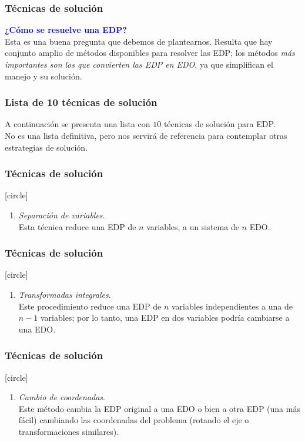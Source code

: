 \documentclass[12pt]{beamer}
\begin{document}
\begin{frame}
\frametitle{Técnicas de solución}
\textcolor{blue}{\textbf{¿Cómo se resuelve una EDP?}}
\\
\bigskip
\pause
Esta es una buena pregunta que debemos de plantearnos. Resulta que hay conjunto amplio de métodos disponibles para resolver las EDP; los métodos \emph{más importantes son los que convierten las EDP en EDO}, ya que simplifican el manejo y su solución.
\end{frame}
\begin{frame}
\frametitle{Lista de 10 técnicas de solución}
A continuación se presenta una lista con $10$ técnicas de solución para EDP.
\\
\bigskip
No es una lista definitiva, pero nos servirá de referencia para contemplar otras estrategias de solución.
\end{frame}
\begin{frame}
\frametitle{Técnicas de solución}
[circle]
\begin{enumerate}
\item \emph{Separación de variables}.
\\
\bigskip
Esta técnica reduce una EDP de $n$ variables, a un sistema de $n$ EDO.
\seti
\end{enumerate}
\end{frame}
\begin{frame}
\frametitle{Técnicas de solución}
[circle]
\begin{enumerate}
\conti
\item \emph{Transformadas integrales}. 
\\
\bigskip
Este procedimiento reduce una EDP de $n$ variables independientes a una de $n - 1$ variables; por lo tanto, una EDP en dos variables podría cambiarse a una EDO.
\seti
\end{enumerate}
\end{frame}
\begin{frame}
\frametitle{Técnicas de solución}
[circle]
\begin{enumerate}
\conti
\item \emph{Cambio de coordenadas}.
\\
\bigskip
Este método cambia la EDP original a una EDO o bien a otra EDP (una más fácil) cambiando las coordenadas del problema (rotando el eje o transformaciones similares).
\seti
\end{enumerate}
\end{frame}
\end{document}
